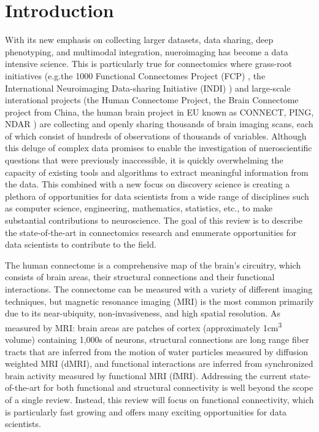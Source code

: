 \section{Introduction}

With its new emphasis on collecting larger datasets, data sharing, deep phenotyping, and multimodal integration, nueroimaging has become a data intensive science. This is particularly true for connectomics where grass-root initiatives (e.g.the 1000 Functional Connectomes Project (FCP) \cite{Biswal2010}, the International Neuroimaging Data-sharing Initiative (INDI) \cite{Mennes2013}) and large-scale interational projects (the Human Connectome Project\cite{Sotiropoulus2013,VanEssen2012}, the Brain Connectome project from China\cite{Jiang2013}, the human brain project in EU known as CONNECT\cite{Assaf2013}, PING, NDAR ) are collecting and openly sharing thousands of brain imaging scans, each of which consist of hundreds of observations of thousands of variables. Although this deluge of complex data promises to enable the investigation of nueroscientific questions that were previously inaccessible, it is quickly overwhelming the capacity of existing tools and algorithms to extract meaningful information from the data. This combined with a new focus on discovery science is creating a plethora of opportunities for data scientists from a wide range of disciplines such as computer science, engineering, mathematics, statistics, etc., to make substantial contributions to neuroscience. The goal of this review is to describe the state-of-the-art in connectomics research and enumerate opportunities for data scientists to contribute to the field.

The human connectome is a comprehensive map of the brain's circuitry, which consists of brain areas, their structural connections and their functional interactions. The connectome can be measured with a variety of different imaging techniques, but magnetic resonance imaging (MRI) is the most common primarily due to its near-ubiquity, non-invasiveness, and high spatial resolution. As measured by MRI: brain areas are patches of cortex (approximately 1\si{\centi\meter\cubed} volume) containing 1,000s of neurons, structural connections are long range fiber tracts that are inferred from the motion of water particles measured by diffusion weighted MRI (dMRI), and functional interactions are inferred from synchronized brain activity measured by functional MRI (fMRI). Addressing the current state-of-the-art for both functional and structural connectivity is well beyond the scope of a single review. Instead, this review will focus on functional connectivity, which is particularly fast growing and offers many exciting opportunities for data scientists.


